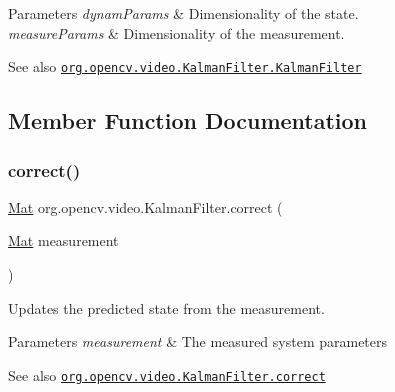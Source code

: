 \begin{DoxyParams}{Parameters}
{\em dynam\+Params} & Dimensionality of the state. \\
\hline
{\em measure\+Params} & Dimensionality of the measurement.\\
\hline
\end{DoxyParams}
\begin{DoxySeeAlso}{See also}
\href{http://docs.opencv.org/modules/video/doc/motion_analysis_and_object_tracking.html#kalmanfilter-kalmanfilter}{\tt org.\+opencv.\+video.\+Kalman\+Filter.\+Kalman\+Filter} 
\end{DoxySeeAlso}


\subsection{Member Function Documentation}
\mbox{\label{classorg_1_1opencv_1_1video_1_1_kalman_filter_a7c610a98cf5e5aae5d9600b99a476127}} 
\subsubsection{\texorpdfstring{correct()}{correct()}}
{\footnotesize\ttfamily \mbox{\hyperlink{classorg_1_1opencv_1_1core_1_1_mat}{Mat}} org.\+opencv.\+video.\+Kalman\+Filter.\+correct (\begin{DoxyParamCaption}\item[{\mbox{\hyperlink{classorg_1_1opencv_1_1core_1_1_mat}{Mat}}}]{measurement }\end{DoxyParamCaption})}

Updates the predicted state from the measurement.


\begin{DoxyParams}{Parameters}
{\em measurement} & The measured system parameters\\
\hline
\end{DoxyParams}
\begin{DoxySeeAlso}{See also}
\href{http://docs.opencv.org/modules/video/doc/motion_analysis_and_object_tracking.html#kalmanfilter-correct}{\tt org.\+opencv.\+video.\+Kalman\+Filter.\+correct} 
\end{DoxySeeAlso}
\mbox{\label{classorg_1_1opencv_1_1video_1_1_kalman_filter_a89fc46ce23e571ad964c3db45baeadc6}} 
